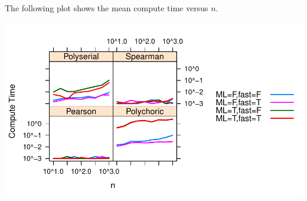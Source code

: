 \documentclass[]{article}
\begin{document}
The following plot shows the mean compute time versus \(n\).

\includegraphics{./tex2pdf.25548/1cd97661318e4d1b89fbc91a222d4823a8a80b5c.pdf}
\end{document}

